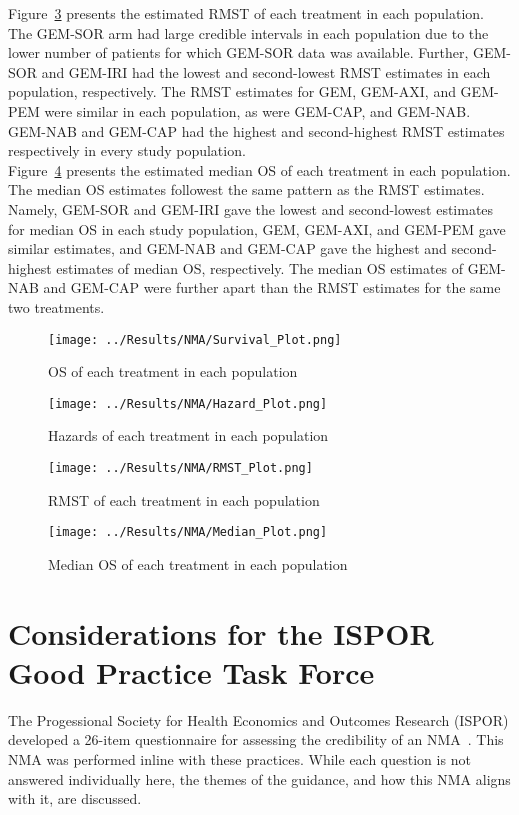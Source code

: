 Figure~\ref{fig:pred_rmstbc} presents the estimated RMST of each treatment in each population. The GEM-SOR arm had large credible intervals in each population due to the lower number of patients for which GEM-SOR data was available. Further, GEM-SOR and GEM-IRI had the lowest and second-lowest RMST estimates in each population, respectively. The RMST estimates for GEM, GEM-AXI, and GEM-PEM were similar in each population, as were GEM-CAP, and GEM-NAB. GEM-NAB and GEM-CAP had the highest and second-highest RMST estimates respectively in every study population. \\

Figure~\ref{fig:pred_medianbc} presents the estimated median OS of each treatment in each population. The median OS estimates followest the same pattern as the RMST estimates. Namely, GEM-SOR and GEM-IRI gave the lowest and second-lowest estimates for median OS in each study population, GEM, GEM-AXI, and GEM-PEM gave similar estimates, and GEM-NAB and GEM-CAP gave the highest and second-highest estimates of median OS, respectively. The median OS estimates of GEM-NAB and GEM-CAP were further apart than the RMST estimates for the same two treatments. 

\begin{figure}[h]
    \centering
    \texttt{[image: ../Results/NMA/Survival\_Plot.png]}
    \caption{OS of each treatment in each population}
    \label{fig:pred_survbc}
\end{figure}

\begin{figure}[h]
    \centering
    \texttt{[image: ../Results/NMA/Hazard\_Plot.png]}
    \caption{Hazards of each treatment in each population}
    \label{fig:pred_hazardbc}
\end{figure}

\begin{figure}[h]
    \centering
    \texttt{[image: ../Results/NMA/RMST\_Plot.png]}
    \caption{RMST of each treatment in each population}
    \label{fig:pred_rmstbc}
\end{figure}

\begin{figure}[h]
    \centering
    \texttt{[image: ../Results/NMA/Median\_Plot.png]}
    \caption{Median OS of each treatment in each population}
    \label{fig:pred_medianbc}
\end{figure}

\section{Considerations for the ISPOR Good Practice Task Force}
The Progessional Society for Health Economics and Outcomes Research (ISPOR) developed a 26-item questionnaire for assessing the credibility of an NMA~\cite{jansengp}. This NMA was performed inline with these practices. While each question is not answered individually here, the themes of the guidance, and how this NMA aligns with it, are discussed. \\

